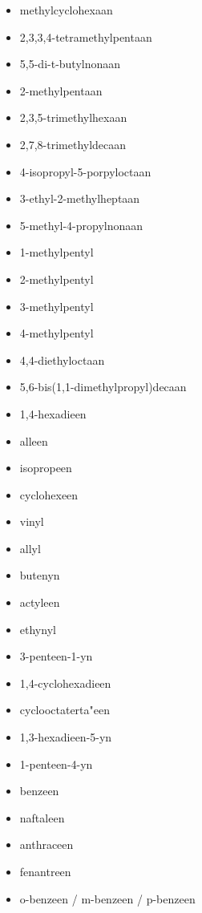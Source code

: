 \documentclass[a4paper,12pt]{article}
\begin{document}
\begin{enumerate}
\begin{itemize}
                \item methylcyclohexaan
                \item 2,3,3,4-tetramethylpentaan
                \item 5,5-di-t-butylnonaan
                \item 2-methylpentaan
                \item 2,3,5-trimethylhexaan
                \item 2,7,8-trimethyldecaan
                \item 4-isopropyl-5-porpyloctaan
                \item 3-ethyl-2-methylheptaan
                \item 5-methyl-4-propylnonaan
                \item 1-methylpentyl
                \item 2-methylpentyl
                \item 3-methylpentyl
                \item 4-methylpentyl
                \item 4,4-diethyloctaan
                \item 5,6-bis(1,1-dimethylpropyl)decaan
                \item 1,4-hexadieen
                \item alleen 
                \item isopropeen
                \item cyclohexeen
                \item vinyl
                \item allyl
                \item butenyn
                \item actyleen
                \item ethynyl
                \item 3-penteen-1-yn
                \item 1,4-cyclohexadieen
                \item cyclooctaterta"een
                \item 1,3-hexadieen-5-yn
                \item 1-penteen-4-yn
                \item benzeen
                \item naftaleen
                \item anthraceen
                \item fenantreen
                \item o-benzeen / m-benzeen / p-benzeen

\end{itemize}
\end{enumerate}
\end{document}
